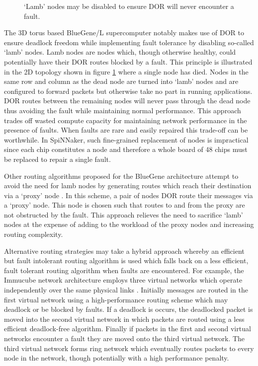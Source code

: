 			\begin{figure}
				\center
				
				\caption{`Lamb' nodes may be disabled to ensure DOR will never
				encounter a fault.}
				\label{fig:lamb-nodes}
			\end{figure}
			
			The 3D torus based BlueGene/L supercomputer \cite{adiga02} notably makes
			use of DOR to ensure deadlock freedom while implementing fault tolerance
			by disabling so-called `lamb' nodes. Lamb nodes are nodes which, though
			otherwise healthy, could potentially have their DOR routes blocked by a
			fault. This principle is illustrated in the 2D topology shown in figure
			\ref{fig:lamb-nodes} where a single node has died. Nodes in the same row
			and column as the dead node are turned into `lamb' nodes and are
			configured to forward packets but otherwise take no part in running
			applications. DOR routes between the remaining nodes will never pass
			through the dead node thus avoiding the fault while maintaining normal
			performance. This approach trades off wasted compute capacity for
			maintaining network performance in the presence of faults. When faults
			are rare and easily repaired this trade-off can be worthwhile. In
			SpiNNaker, such fine-grained replacement of nodes is impractical since
			each chip constitutes a node and therefore a whole board of 48 chips must
			be replaced to repair a single fault.
			
			Other routing algorithms proposed for the BlueGene architecture attempt
			to avoid the need for lamb nodes by generating routes which reach their
			destination via a `proxy' node \cite{gomez04}. In this scheme, a pair of
			nodes DOR route their messages via a `proxy' node.  This node is chosen
			such that routes to and from the proxy are not obstructed by the fault.
			This approach relieves the need to sacrifice `lamb' nodes at the expense
			of adding to the workload of the proxy nodes and increasing routing
			complexity.
			
			Alternative routing strategies may take a hybrid approach whereby an
			efficient but fault intolerant routing algorithm is used which falls back
			on a less efficient, fault tolerant routing algorithm when faults are
			encountered. For example, the Immucube network architecture employs three
			virtual networks which operate independently over the same physical links
			\cite{puente07}. Initially messages are routed in the first virtual
			network using a high-performance routing scheme which may deadlock or be
			blocked by faults.  If a deadlock is occurs, the deadlocked packet is
			moved into the second virtual network in which packets are routed using a
			less efficient deadlock-free algorithm. Finally if packets in the first
			and second virtual networks encounter a fault they are moved onto the
			third virtual network. The third virtual network forms ring network which
			eventually routes packets to every node in the network, though
			potentially with a high performance penalty.
			
